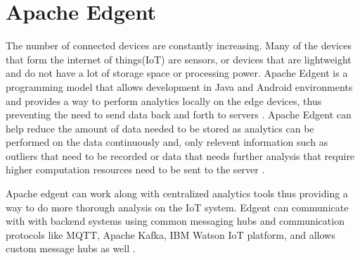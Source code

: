 \section{Apache Edgent}

The number of connected devices are constantly increasing.
Many of the devices that form the internet of things(IoT) are sensors,
or devices that are lightweight and do not have a lot of storage space
or processing power.
Apache Edgent is a programming model that allows development in Java and
Android environments and provides a way to perform analytics locally on
the edge devices, thus preventing the need to send data back and forth to
servers \cite{hid-sp18-503-www-edgent}. Apache Edgent can help reduce
the amount of data needed to be stored as analytics can be performed on
the data continuously and, only relevent information such as outliers
that need to be recorded or data that needs further analysis that require
higher computation resources need to be sent to the server
\cite{hid-sp18-503-www-edgent-docs}.

Apache edgent can work along with centralized analytics tools thus providing
a way to do more thorough analysis on the IoT system. Edgent can
communicate with with backend systems using common messaging hubs and
communication protocols like MQTT, Apache Kafka, IBM Watson IoT platform,
and allows custom message hubs as well \cite{hid-sp18-503-www-edgent-docs}.
